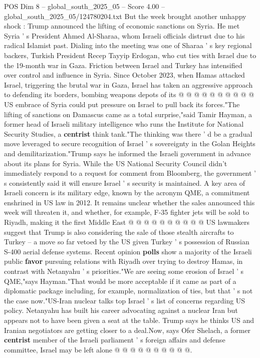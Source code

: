 \begin{textsample}{POS Dim 8 – global\_south\_2025\_05 – Score 4.00 – global\_south\_2025\_05/124780204.txt}
But the week brought another unhappy shock : Trump announced the lifting of economic sanctions on Syria.
He met Syria ' s President Ahmed Al-Sharaa, whom Israeli officials distrust due to his radical Islamist past.
Dialing into the meeting was one of Sharaa ' s key regional backers, Turkish President Recep Tayyip Erdogan, who cut ties with Israel due to the 19-month war in Gaza.
Friction between Israel and Turkey has intensified over control and influence in Syria.
Since October 2023, when Hamas attacked Israel, triggering the brutal war in Gaza, Israel has taken an aggressive approach to defending its borders, bombing weapons depots of its @ @ @ @ @ @ @ @ @ @ US embrace of Syria could put pressure on Israel to pull back its forces."The lifting of sanctions on Damascus came as a total surprise,"said Tamir Hayman, a former head of Israeli military intelligence who runs the Institute for National Security Studies, a \textbf{centrist} think tank."The thinking was there ' d be a gradual move leveraged to secure recognition of Israel ' s sovereignty in the Golan Heights and demilitarization."Trump says he informed the Israeli government in advance about its plans for Syria.
While the US National Security Council didn't immediately respond to a request for comment from Bloomberg, the government ' s consistently said it will ensure Israel ' s security is maintained.
A key area of Israeli concern is its military edge, known by the acronym QME, a commitment enshrined in US law in 2012.
It remains unclear whether the sales announced this week will threaten it, and whether, for example, F-35 fighter jets will be sold to Riyadh, making it the first Middle East @ @ @ @ @ @ @ @ @ @ US lawmakers suggest that Trump is also considering the sale of those stealth aircrafts to Turkey -- a move so far vetoed by the US given Turkey ' s possession of Russian S-400 aerial defense systems.
Recent opinion \textbf{polls} show a majority of the Israeli public \textbf{favor} pursuing relations with Riyadh over trying to destroy Hamas, in contrast with Netanyahu ' s priorities."We are seeing some erosion of Israel ' s QME,"says Hayman."That would be more acceptable if it came as part of a diplomatic package including, for example, normalization of ties, but that ' s not the case now."US-Iran nuclear talks top Israel ' s list of concerns regarding US policy.
Netanyahu has built his career advocating against a nuclear Iran but appears not to have been given a seat at the table.
Trump says he thinks US and Iranian negotiators are getting closer to a deal.Now, says Ofer Shelach, a former \textbf{centrist} member of the Israeli parliament ' s foreign affairs and defense committee, Israel may be left alone @ @ @ @ @ @ @ @ @ @.

\end{textsample}
